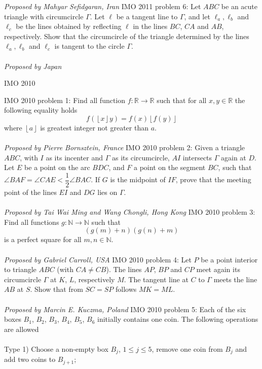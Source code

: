 \textit{Proposed by Mahyar Sefidgaran, Iran} 
IMO 2011 problem 6:  Let $ABC$ be an acute triangle with circumcircle $\Gamma$. Let $\ell$ be a tangent line to $\Gamma$, and let $\ell_a, \ell_b$ and $\ell_c$ be the lines obtained by reflecting $\ell$ in the lines $BC$, $CA$ and $AB$, respectively. Show that the circumcircle of the triangle determined by the lines $\ell_a, \ell_b$ and $\ell_c$ is tangent to the circle $\Gamma$. \\\\
\textit{Proposed by Japan} 

IMO 2010 

IMO 2010 problem 1:  Find all function $f:\mathbb{R}\rightarrow\mathbb{R}$ such that for all $x,y\in\mathbb{R}$ the following equality holds
\[ f(\left\lfloor x\right\rfloor y)=f(x)\left\lfloor f(y)\right\rfloor \]
where $\left\lfloor a\right\rfloor $ is greatest integer not greater than $a.$ \\\\
\textit{Proposed by Pierre Bornsztein, France} 
IMO 2010 problem 2:  Given a triangle $ABC$, with $I$ as its incenter and $\Gamma$ as its circumcircle, $AI$ intersects $\Gamma$ again at $D$. Let $E$ be a point on the arc $BDC$, and $F$ a point on the segment $BC$, such that $\angle BAF=\angle CAE < \dfrac12\angle BAC$. If $G$ is the midpoint of $IF$, prove that the meeting point of the lines $EI$ and $DG$ lies on $\Gamma$. \\\\
\textit{Proposed by Tai Wai Ming and Wang Chongli, Hong Kong} 
IMO 2010 problem 3:  Find all functions $g:\mathbb{N}\rightarrow\mathbb{N}$ such that
\[ \left(g(m)+n\right)\left(g(n)+m\right) \]
is a perfect square for all $m,n\in\mathbb{N}.$ \\\\
\textit{Proposed by Gabriel Carroll, USA} 
IMO 2010 problem 4:  Let $P$ be a point interior to triangle $ABC$ (with $CA \neq CB$). The lines $AP$, $BP$ and $CP$ meet again its circumcircle $\Gamma$ at $K$, $L$, respectively $M$. The tangent line at $C$ to $\Gamma$ meets the line $AB$ at $S$. Show that from $SC = SP$ follows $MK = ML$. \\\\
\textit{Proposed by Marcin E. Kuczma, Poland} 
IMO 2010 problem 5:  Each of the six boxes $B_1$, $B_2$, $B_3$, $B_4$, $B_5$, $B_6$ initially contains one coin. The following operations are allowed \\\\
Type 1) Choose a non-empty box $B_j$, $1\leq j \leq 5$, remove one coin from $B_j$ and add two coins to $B_{j+1}$; \\\\
